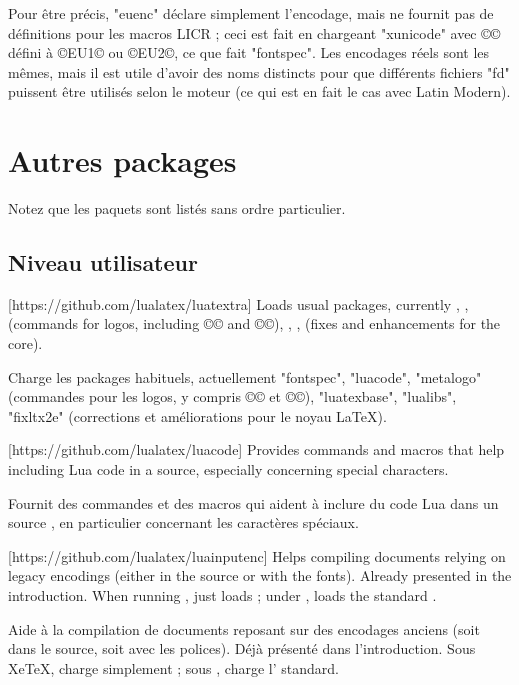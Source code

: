 \documentclass{lltxdoc}
\begin{document}
Pour être précis, "euenc" déclare simplement l'encodage, mais ne fournit pas de définitions pour les macros LICR ; ceci est fait en chargeant "xunicode" avec ©\UTFencname© défini à ©EU1© ou ©EU2©, ce que fait "fontspec". Les encodages réels sont les mêmes, mais il est utile d'avoir des noms distincts pour que différents fichiers "fd" puissent être utilisés selon le moteur (ce qui est en fait le cas avec Latin Modern).

\section{Autres packages}\label{other}

Notez que les paquets sont listés sans ordre particulier.

\subsection{Niveau utilisateur}

[https://github.com/lualatex/luatextra]
Loads usual packages, currently , , 
(commands for logos, including ©\LuaTeX© and ©\LuaLaTeX©), ,
,  (fixes and enhancements for the \latex core).

Charge les packages habituels, actuellement "fontspec", "luacode", "metalogo" (commandes pour les logos, y compris ©\LuaTeX© et ©\LuaLaTeX©), "luatexbase", "lualibs", "fixltx2e" (corrections et améliorations pour le noyau LaTeX).

[https://github.com/lualatex/luacode]
Provides commands and macros that help including Lua code in a \tex source,
especially concerning special characters.

Fournit des commandes et des macros qui aident à inclure du code Lua dans un source \tex, en particulier concernant les caractères spéciaux.

[https://github.com/lualatex/luainputenc]
Helps compiling documents relying on legacy encodings (either in the source or
with the fonts). Already presented in the introduction. When running \xetex,
just loads ; under \pdftex, loads the standard
.

Aide à la compilation de documents reposant sur des encodages anciens (soit dans le source, soit avec les polices). Déjà présenté dans l'introduction. Sous XeTeX, charge simplement ; sous \pdftex, charge l' standard.
\end{document}
